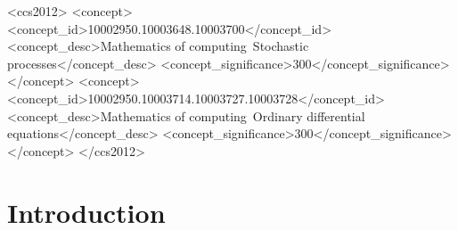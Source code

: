 \documentclass[acmsmall]{acmart}
\begin{document}
\begin{CCSXML}
<ccs2012>
   <concept>
       <concept_id>10002950.10003648.10003700</concept_id>
       <concept_desc>Mathematics of computing~Stochastic processes</concept_desc>
       <concept_significance>300</concept_significance>
       </concept>
   <concept>
       <concept_id>10002950.10003714.10003727.10003728</concept_id>
       <concept_desc>Mathematics of computing~Ordinary differential equations</concept_desc>
       <concept_significance>300</concept_significance>
       </concept>
 </ccs2012>
\end{CCSXML}





\maketitle




\section{Introduction}
\end{document}
